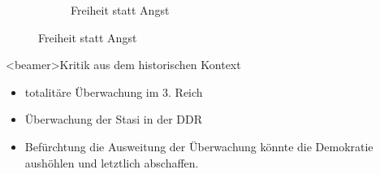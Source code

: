 \begin{frame}
\begin{figure}
\begin{subfigure}[b]{0.3\textwidth}
          \caption{Freiheit statt Angst}
          \label{fig:tiger}
        \end{subfigure}
      \end{figure}
    \end{frame}

    \begin{frame}<beamer>{Kritik aus dem historischen Kontext}
       \begin{itemize}
        \item totalitäre Überwachung im 3. Reich
        \item Überwachung der Stasi in der DDR
        \item Befürchtung die Ausweitung der Überwachung könnte die Demokratie aushöhlen und letztlich abschaffen.
      \end{itemize}
    \end{frame}
